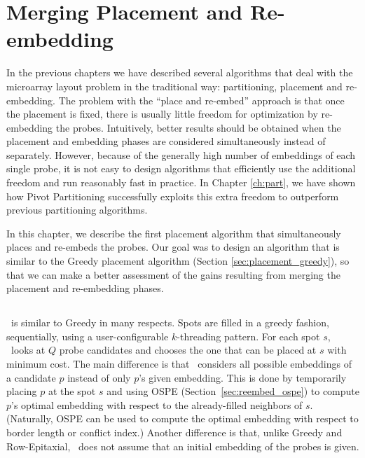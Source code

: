 \chapter{Merging Placement and Re-embedding}
\label{ch:merge}

In the previous chapters we have described several algorithms that deal with the
microarray layout problem in the traditional way: partitioning, placement and
re-embedding. The problem with the ``place and re-embed'' approach is that once
the placement is fixed, there is usually little freedom for optimization by
re-embedding the probes. Intuitively, better results should be obtained when the
placement and embedding phases are considered simultaneously instead of
separately. However, because of the generally high number of embeddings of each
single probe, it is not easy to design algorithms that efficiently use the
additional freedom and run reasonably fast in practice. In Chapter
\ref{ch:part}, we have shown how Pivot Partitioning successfully exploits this
extra freedom to outperform previous partitioning algorithms.

In this chapter, we describe the first placement algorithm that simultaneously
places and re-embeds the probes. Our goal was to design an algorithm that is
similar to the Greedy placement algorithm (Section \ref{sec:placement_greedy}),
so that we can make a better assessment of the gains resulting from merging the
placement and re-embedding phases.

\section{\Greedyplus}
\label{sec:merge_greedyplus}

\Greedyplus\ is similar to Greedy in many respects. Spots are filled in a greedy
fashion, sequentially, using a user-configurable $k$-threading pattern. For each
spot $s$, \Greedyplus\ looks at $Q$ probe candidates and chooses the one that
can be placed at $s$ with minimum cost. The main difference is that \Greedyplus\
considers all possible embeddings of a candidate $p$ instead of only $p$'s given
embedding. This is done by temporarily placing $p$ at the spot $s$ and using
OSPE (Section~\ref{sec:reembed_ospe}) to compute $p$'s optimal embedding with
respect to the already-filled neighbors of $s$. (Naturally, OSPE can be used to
compute the optimal embedding with respect to border length or conflict index.)
Another difference is that, unlike Greedy and Row-Epitaxial, \Greedyplus\ does
not assume that an initial embedding of the probes is given.

